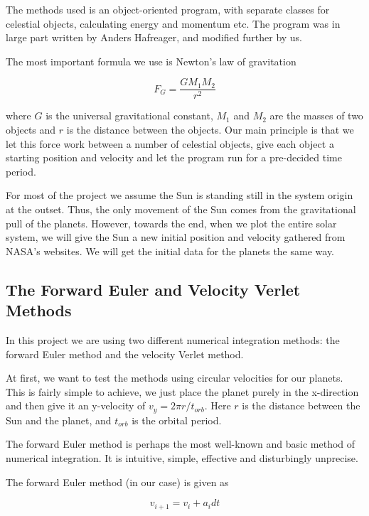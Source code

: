 \documentclass[10pt,showpacs,preprintnumbers,footinbib,amsmath,amssymb,aps,prl,twocolumn,groupedaddress,superscriptaddress,showkeys]{revtex4-1}
\begin{document}
The methods used is an object-oriented program, with separate classes for celestial objects, calculating energy and momentum etc. The program was in large part written by Anders Hafreager, and modified further by us.

The most important formula we use is Newton's law of gravitation

\begin{equation}
F_G = \frac{G M_1 M_2}{r^2}
\end{equation}

where $G$ is the universal gravitational constant, $M_1$ and $M_2$ are the masses of two objects and $r$ is the distance between the objects. Our main principle is that we let this force work between a number of celestial objects, give each object a starting position and velocity and let the program run for a pre-decided time period.

For most of the project we assume the Sun is standing still in the system origin at the outset. Thus, the only movement of the Sun comes from the gravitational pull of the planets. However, towards the end, when we plot the entire solar system, we will give the Sun a new initial position and velocity gathered from NASA's websites. We will get the initial data for the planets the same way.


\subsection{The Forward Euler and Velocity Verlet Methods}


In this project we are using two different numerical integration methods: the forward Euler method and the velocity Verlet method.


At first, we want to test the methods using circular velocities for our planets. This is fairly simple to achieve, we just place the planet purely in the x-direction and then give it an y-velocity of $v_y = 2\pi r/t_{orb}$. Here $r$ is the distance between the Sun and the planet, and $t_{orb}$ is the orbital period.

The forward Euler method is perhaps the most well-known and basic method of numerical integration. It is intuitive, simple, effective and disturbingly unprecise.

The forward Euler method (in our case) is given as 

\begin{equation}
v_{i+1} = v_i + a_i dt
\end{equation}
\end{document}
